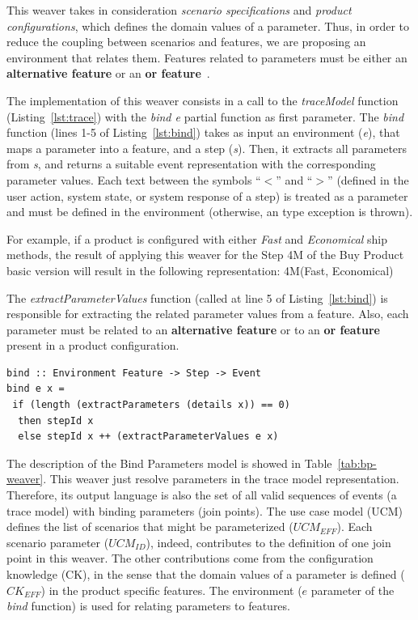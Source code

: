 \documentclass{acm_proc_article-sp}
\begin{document}
This weaver takes in consideration \emph{scenario specifications} and 
\emph{product configurations}, which defines the domain values of a
parameter. Thus, in order to reduce the coupling between scenarios and features, 
we are proposing an environment that relates them. Features related to parameters must be 
either an {\bf alternative feature} or an {\bf or feature}~\cite{gheyi-alloy-06,czarnecki-wsfactory-2005,czarnecki-book}.

The implementation of this weaver consists in a call to 
the \emph{traceModel} function (Listing~\ref{lst:trace}) with
the \emph{bind e} partial function as first parameter. The
\emph{bind} function (lines 1-5 of Listing~\ref{lst:bind}) takes as
input an environment (\emph{e}), that maps a parameter into a
feature, and a step (\emph{s}). Then, it extracts all parameters
from \emph{s}, and returns a suitable event representation with the
corresponding parameter values. Each text between the symbols ``$<$'' and ``$>$''
(defined in the user action, system state, or system response of a
step) is treated as a parameter and must be defined in the
environment (otherwise, an type exception is thrown).

For example, if a product is configured with either \emph{Fast} and 
\emph{Economical} ship methods, the result of applying this weaver for 
the Step 4M of the Buy Product basic version will result in the following 
representation: 4M(Fast, Economical)  

The \emph{extractParameterValues} function (called at line 5 of
Listing~\ref{lst:bind}) is responsible for extracting the related
parameter values from a feature. Also, each parameter must be
related to an {\bf alternative feature} or to an {\bf or feature}
present in a product configuration. 

\begin{lstlisting}[belowskip=10pt,frame=tb,caption={The \emph{bind weaver} function},label=lst:bind]
bind :: Environment Feature -> Step -> Event
bind e x =
 if (length (extractParameters (details x)) == 0)
  then stepId x
  else stepId x ++ (extractParameterValues e x)
\end{lstlisting}

The description of the Bind Parameters model is 
showed in Table~\ref{tab:bp-weaver}. This weaver just resolve parameters in 
the trace model representation. Therefore, its output language is also the set 
of all valid sequences of events (a trace model) with binding parameters (join points). 
The use case model (UCM) defines the list of scenarios that might be parameterized ($UCM_{EFF}$). Each scenario 
parameter ($UCM_{ID}$), indeed, contributes to the definition of one join point in this weaver. The 
other contributions come from the configuration knowledge (CK), in the sense that the domain values 
of a parameter is defined ($CK_{EFF}$) in the product specific features. The environment ($e$ parameter of the \emph{bind} function) is 
used for relating parameters to features. 
\end{document}
